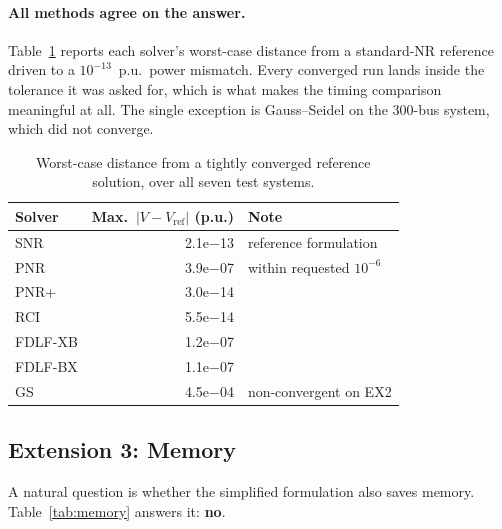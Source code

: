 \documentclass[sigconf,nonacm]{acmart}
\begin{document}
\paragraph{All methods agree on the answer.}
Table~\ref{tab:agreement} reports each solver's worst-case distance from a
standard-NR reference driven to a $10^{-13}$~p.u.\ power mismatch. Every
converged run lands inside the tolerance it was asked for, which is what makes
the timing comparison meaningful at all. The single exception is Gauss--Seidel
on the 300-bus system, which did not converge.

\begin{table}[t]
\centering
\caption{Worst-case distance from a tightly converged reference solution, over
all seven test systems.}
\label{tab:agreement}
\small
\begin{tabular}{l r l}
\toprule
Solver & Max.\ $|V - V_{\mathrm{ref}}|$ (p.u.) & Note \\
\midrule
SNR     & 2.1e$-$13 & reference formulation \\
PNR     & 3.9e$-$07 & within requested $10^{-6}$ \\
PNR+    & 3.0e$-$14 & \\
RCI     & 5.5e$-$14 & \\
FDLF-XB & 1.2e$-$07 & \\
FDLF-BX & 1.1e$-$07 & \\
GS      & 4.5e$-$04 & non-convergent on EX2 \\
\bottomrule
\end{tabular}
\end{table}

\subsection{Extension 3: Memory}
\label{sec:res-memory}
A natural question is whether the simplified formulation also saves memory.
Table~\ref{tab:memory} answers it: \textbf{no}.
\end{document}
